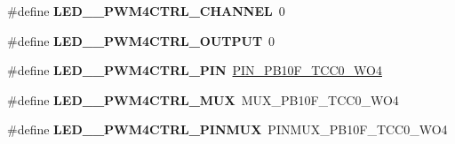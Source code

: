 \begin{DoxyCompactItemize}
\item 
\hypertarget{group__saml21__xplained__pro__features__group_gabac868436fcfacb2ceec0da9dd92813f}{}\#define {\bfseries L\+E\+D\+\_\+\_\+\+P\+W\+M4\+C\+T\+R\+L\+\_\+\+C\+H\+A\+N\+N\+E\+L}~0\label{group__saml21__xplained__pro__features__group_gabac868436fcfacb2ceec0da9dd92813f}

\item 
\hypertarget{group__saml21__xplained__pro__features__group_ga43bb0db8e9ccd8c4add4b1fc0b8e7f12}{}\#define {\bfseries L\+E\+D\+\_\+\_\+\+P\+W\+M4\+C\+T\+R\+L\+\_\+\+O\+U\+T\+P\+U\+T}~0\label{group__saml21__xplained__pro__features__group_ga43bb0db8e9ccd8c4add4b1fc0b8e7f12}

\item 
\hypertarget{group__saml21__xplained__pro__features__group_gaaa92d7fc6e068547c5eb03d646b91665}{}\#define {\bfseries L\+E\+D\+\_\+\_\+\+P\+W\+M4\+C\+T\+R\+L\+\_\+\+P\+I\+N}~\hyperlink{pio_2saml21j18a_8h_a39092863d440aacb6bbc8639c23f134c}{P\+I\+N\+\_\+\+P\+B10\+F\+\_\+\+T\+C\+C0\+\_\+\+W\+O4}\label{group__saml21__xplained__pro__features__group_gaaa92d7fc6e068547c5eb03d646b91665}

\item 
\hypertarget{group__saml21__xplained__pro__features__group_gac12a88456204503e574cb5adb106a959}{}\#define {\bfseries L\+E\+D\+\_\+\_\+\+P\+W\+M4\+C\+T\+R\+L\+\_\+\+M\+U\+X}~M\+U\+X\+\_\+\+P\+B10\+F\+\_\+\+T\+C\+C0\+\_\+\+W\+O4\label{group__saml21__xplained__pro__features__group_gac12a88456204503e574cb5adb106a959}

\item 
\hypertarget{group__saml21__xplained__pro__features__group_gaf65e221d66d5ee899dc2fc2b1c264a01}{}\#define {\bfseries L\+E\+D\+\_\+\_\+\+P\+W\+M4\+C\+T\+R\+L\+\_\+\+P\+I\+N\+M\+U\+X}~P\+I\+N\+M\+U\+X\+\_\+\+P\+B10\+F\+\_\+\+T\+C\+C0\+\_\+\+W\+O4\label{group__saml21__xplained__pro__features__group_gaf65e221d66d5ee899dc2fc2b1c264a01}

\end{DoxyCompactItemize}
